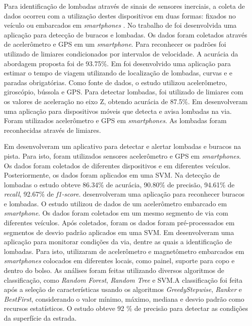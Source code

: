 Para identificação de lombadas através de sinais de sensores inerciais, a coleta de dados ocorreu com a utilização destes dispositivos em duas formas: fixados no veículo \cite{Sabir2019,Padilla2018} ou embarcados em \textit{smartphones} \cite{Fouad2014,Alam2020,Rishiwal2016,Wang2018,Verma2016,Souza2018,Edwan2019,Savera2016,Idris2019,Dey2019,Aljaafreh2017,Aragon2016}. No trabalho de \cite{Rishiwal2016} foi desenvolvida uma aplicação para detecção de buracos e lombadas. Os dados foram coletados através de acelerômetro e GPS em um \textit{smartphone}. Para reconhecer os padrões foi utilizado de limiares condicionados por intervalos de velocidade. A acurácia da abordagem proposta foi de 93.75\%. Em \cite{Verma2016} foi desenvolvido uma aplicação para estimar o tempo de viagem utilizando de localização de lombadas, curvas e e paradas obrigatórias. Como fonte de dados, o estudo utilizou acelerômetro, giroscópio, bússola e GPS. Para detectar lombadas, foi utilizado de limiares com os valores de aceleração no eixo Z, obtendo acurácia de 87.5\%. Em \cite{Edwan2019} desenvolveram uma aplicação para dispositivos móveis que detecta e avisa lombadas na via. Foram utilizados acelerômetro e GPS em \textit{smartphones}. As lombadas foram reconhecidas através de limiares.

Em \cite{Savera2016} desenvolveram um aplicativo para detectar e alertar lombadas e buracos na pista. Para isto, foram utilizados sensores acelerômetro e GPS em \textit{smartphones}. Os dados foram coletados de diferentes dispositivos e em diferentes veículos. Posteriormente, os dados foram aplicados em uma SVM. Na detecção de lombadas o estudo obteve 86.34\% de acurácia, 90.80\% de precisão, 94.61\% de \textit{recall}, 92.67\% de \textit{f1-score}. \cite{Idris2019} desenvolveram uma aplicação para reconhecer buracos e lombadas. O estudo utilizou de dados de um acelerômetro embarcado em \textit{smartphone}. Os dados foram coletados em um mesmo segmento de via com diferentes veículos. Após coletados, foram os dados foram pré-processados em segmentos de desvio padrão aplicados em uma SVM. Em \cite{Dey2019} desenvolveram uma aplicação para monitorar condições da via, dentre as quais a identificação de lombadas. Para isto, utilizaram de acelerômetro e magnetômetro embarcados em \textit{smartphones} colocados em diferentes locais, como painel, suporte para copo e dentro do bolso. As análises foram feitas utilizando diversos algoritmos de classificação, como \textit{Random Forest}, \textit{Random Tree} e SVM.A classificação foi feita após a seleção de características usando os algoritmos \textit{GreedyStepwise}, \textit{Ranker} e \textit{BestFirst}, considerando o valor mínimo, máximo, mediana e desvio padrão como recursos estatísticos. O estudo obteve 92 \% de precisão para detectar as condições da superfície da estrada.

